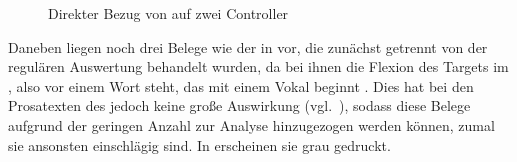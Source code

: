 \begin{figure}
\caption{Direkter Bezug von  auf zwei Controller}
\label{fig:beid2coordncao1_1}
\end{figure}

Daneben liegen noch drei Belege wie der in  vor, die
zunächst getrennt von der regulären Auswertung behandelt wurden, da bei ihnen
die Flexion des Targets im , also vor einem Wort steht, das mit
einem Vokal beginnt \autocites[vgl.][90--91]{askedal1973}[191--193,
201]{gjelsten1980}. Dies hat bei den Prosatexten des \CAO{} jedoch
keine große Auswirkung (vgl.~), sodass diese Belege
aufgrund der geringen Anzahl zur Analyse hinzugezogen werden können, zumal sie
ansonsten einschlägig sind. In  erscheinen sie grau
gedruckt.


